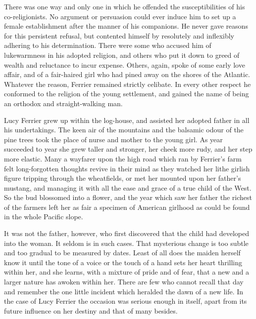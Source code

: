 \documentclass[12pt,english,oneside]{book}
\begin{document}
There was one way and only one in which he offended the susceptibilities
of his co-religionists. No argument or persuasion could ever induce
him to set up a female establishment after the manner of his companions.
He never gave reasons for this persistent refusal, but contented himself
by resolutely and inflexibly adhering to his determination. There
were some who accused him of lukewarmness in his adopted religion,
and others who put it down to greed of wealth and reluctance to incur
expense. Others, again, spoke of some early love affair, and of a
fair-haired girl who had pined away on the shores of the Atlantic.
Whatever the reason, Ferrier remained strictly celibate. In every
other respect he conformed to the religion of the young settlement,
and gained the name of being an orthodox and straight-walking man.

Lucy Ferrier grew up within the log-house, and assisted her adopted
father in all his undertakings. The keen air of the mountains and
the balsamic odour of the pine trees took the place of nurse and mother
to the young girl. As year succeeded to year she grew taller and stronger,
her cheek more rudy, and her step more elastic. Many a wayfarer upon
the high road which ran by Ferrier's farm felt long-forgotten thoughts
revive in their mind as they watched her lithe girlish figure tripping
through the wheatfields, or met her mounted upon her father's mustang,
and managing it with all the ease and grace of a true child of the
West. So the bud blossomed into a flower, and the year which saw her
father the richest of the farmers left her as fair a specimen of American
girlhood as could be found in the whole Pacific slope.

It was not the father, however, who first discovered that the child
had developed into the woman. It seldom is in such cases. That mysterious
change is too subtle and too gradual to be measured by dates. Least
of all does the maiden herself know it until the tone of a voice or
the touch of a hand sets her heart thrilling within her, and she learns,
with a mixture of pride and of fear, that a new and a larger nature
has awoken within her. There are few who cannot recall that day and
remember the one little incident which heralded the dawn of a new
life. In the case of Lucy Ferrier the occasion was serious enough
in itself, apart from its future influence on her destiny and that
of many besides.
\end{document}
